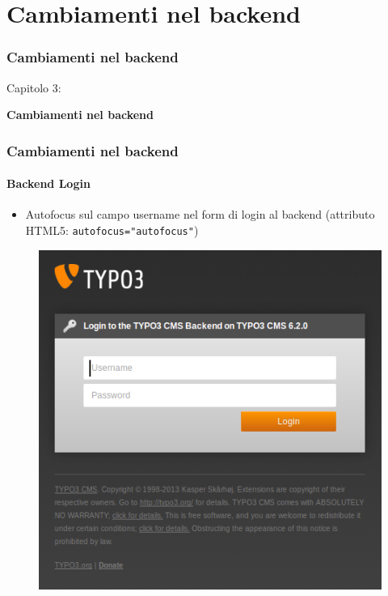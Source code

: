 %

\section{Cambiamenti nel backend}
\begin{frame}[fragile]
	\frametitle{Cambiamenti nel backend}

	\begin{center}\huge{Capitolo 3:}\end{center}
	\begin{center}\huge{\color{typo3darkgrey}\textbf{Cambiamenti nel backend}}\end{center}

\end{frame}


\begin{frame}[fragile]
	\frametitle{Cambiamenti nel backend}
	\framesubtitle{Backend Login}

 	\begin{itemize}
		\item Autofocus sul campo username nel form di login al backend\newline
			(attributo HTML5: \texttt{autofocus="autofocus"})
	\end{itemize}

	\begin{figure}
		\includegraphics[width=0.4\linewidth]{Images/BackendChanges/BackendLogin.png}
	\end{figure}

\end{frame}


